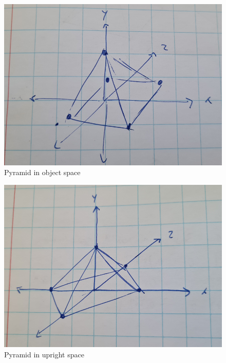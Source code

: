\documentclass[a4paper,11pt]{article}
\begin{document}
\begin{figure}[H]
\centering
    \includegraphics[scale=0.65]{03_object_space}
\caption{Pyramid in object space}
\label{fig:pyramid-object-space}
\end{figure}

\begin{figure}[H]
\centering
    \includegraphics[scale=0.65]{03_upright_space}
\caption{Pyramid in upright space}
\label{fig:pyramid-upright-space}
\end{figure}
\end{document}
